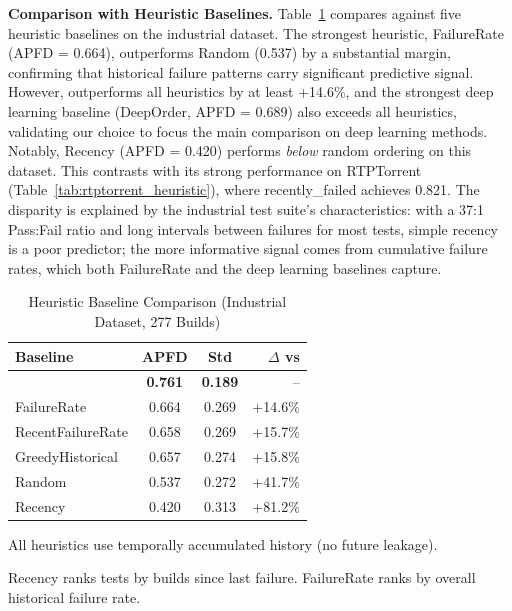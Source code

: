 \textbf{Comparison with Heuristic Baselines.}
Table~\ref{tab:heuristic_industry} compares \filopriori{} against five
heuristic baselines on the industrial dataset. The strongest heuristic,
FailureRate (APFD = 0.664), outperforms Random (0.537) by a substantial
margin, confirming that historical failure patterns carry significant
predictive signal. However, \filopriori{} outperforms all heuristics by
at least +14.6\%, and the strongest deep learning baseline
(DeepOrder, APFD = 0.689) also exceeds all heuristics, validating our
choice to focus the main comparison on deep learning methods. Notably,
Recency (APFD = 0.420) performs \emph{below} random ordering on this
dataset. This contrasts with its strong performance on RTPTorrent
(Table~\ref{tab:rtptorrent_heuristic}), where recently\_failed achieves
0.821. The disparity is explained by the industrial test suite's
characteristics: with a 37:1 Pass:Fail ratio and long intervals between
failures for most tests, simple recency is a poor predictor; the more
informative signal comes from cumulative failure rates, which both
FailureRate and the deep learning baselines capture.

\begin{table}[!t]
\centering
\caption{Heuristic Baseline Comparison (Industrial Dataset, 277 Builds)}
\label{tab:heuristic_industry}
\scriptsize
\begin{tabular}{lccr}
\toprule
\textbf{Baseline} & \textbf{APFD} & \textbf{Std} & \textbf{$\Delta$ vs \filopriori{}} \\
\midrule
\textbf{\filopriori{}} & \textbf{0.761} & \textbf{0.189} & -- \\
FailureRate & 0.664 & 0.269 & +14.6\% \\
RecentFailureRate & 0.658 & 0.269 & +15.7\% \\
GreedyHistorical & 0.657 & 0.274 & +15.8\% \\
Random & 0.537 & 0.272 & +41.7\% \\
Recency & 0.420 & 0.313 & +81.2\% \\
\bottomrule
\end{tabular}
\begin{tablenotes}
\small
\item All heuristics use temporally accumulated history (no future leakage).
\item Recency ranks tests by builds since last failure. FailureRate
ranks by overall historical failure rate.
\end{tablenotes}
\end{table}

